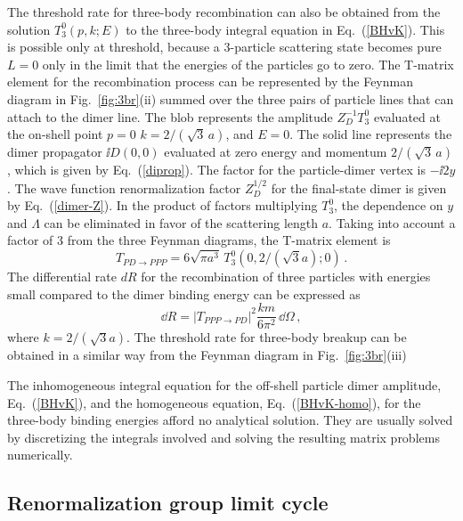 The threshold rate for three-body recombination can also be obtained 
from the solution $T_3^0 (p, k; E)$ to the three-body integral 
equation in Eq.~(\ref{BHvK}). This is possible only at threshold, 
because a 3-particle scattering state becomes pure $L=0$ only
in the limit that the energies of the particles go to zero. 
The T-matrix element for the recombination process can be represented 
by the Feynman diagram in Fig.~\ref{fig:3br}(ii)
summed over the three pairs of particle lines that can attach 
to the dimer line.
The blob represents the amplitude $Z_D^{-1} T_3^0$ evaluated 
at the on-shell point $p=0$ $k=2/(\sqrt{3}\, a)$, and $E=0$.
The solid line represents the dimer propagator $\ii D(0,0)$
evaluated at zero energy and momentum $2/(\sqrt{3}\, a)$, which is given by 
Eq.~(\ref{diprop}).  The factor for the particle-dimer vertex is $-\ii 2y$.
The wave function renormalization factor $Z_D^{1/2}$ for the
final-state dimer is given by Eq.~(\ref{dimer-Z}).
In the product of factors multiplying $T_3^0$, 
the dependence on $y$ and $\Lambda$ can be eliminated in favor 
of the scattering length $a$.
Taking into account a factor of 3 from the three Feynman diagrams,
the T-matrix element is
\begin{equation}
 T_{PD \to PPP} = 6\sqrt{\pi a^3}\, 
 T_3^0 (0, 2/(\sqrt{3}a);0) \,.
\end{equation}
The differential rate $dR$ for the recombination of three particles
with energies small compared to the dimer binding energy
can be expressed as
\begin{equation}
 \dd R = \left| T_{PPP \to PD} \right|^2
 \frac{k m}{6 \pi^2}\, \dd \Omega \,,
\label{dR-T}
\end{equation}
where $k = 2/(\sqrt{3} a)$.
The threshold rate for three-body breakup can be obtained
in a similar way from  the Feynman diagram in Fig.~\ref{fig:3br}(iii)

The inhomogeneous integral equation for the off-shell particle dimer 
amplitude, Eq.~(\ref{BHvK}), and the homogeneous equation, 
Eq.~(\ref{BHvK-homo}), for the three-body binding energies afford
no analytical solution. They are usually solved by 
discretizing the integrals involved and solving the resulting
matrix problems numerically.

\subsection{Renormalization group limit cycle}
\label{sec:RGlc}

